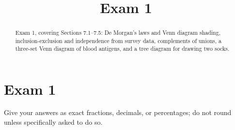 \documentclass[12pt]{ximera}
\title{Exam 1}
\begin{document}
\begin{abstract}
Exam 1, covering Sections 7.1--7.5: De Morgan's laws and Venn diagram shading,
inclusion-exclusion and independence from survey data, complements of unions, a
three-set Venn diagram of blood antigens, and a tree diagram for drawing two socks.
\end{abstract}
\maketitle

\section*{Exam 1}

Give your answers as exact fractions, decimals, or percentages; do not round unless
specifically asked to do so.
\end{document}
